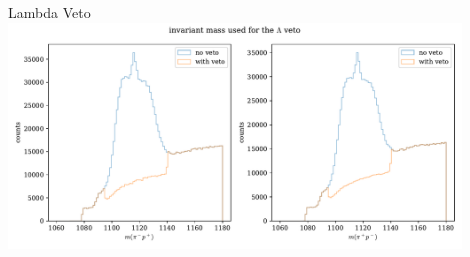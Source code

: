 \documentclass[aspectratio=1610, 10pt]{beamer}
\begin{document}
\begin{frame}{Lambda Veto}
  \centering
  \includegraphics[width=0.9\textwidth]{images/backup/lambda_veto.pdf}  
\end{frame}
\end{document}

